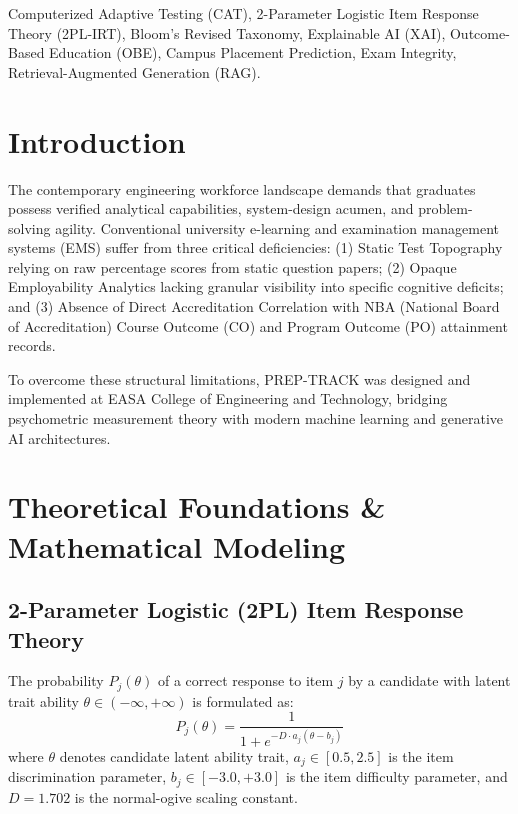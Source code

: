\documentclass[conference]{IEEEtran}
\begin{document}
\begin{IEEEkeywords}
Computerized Adaptive Testing (CAT), 2-Parameter Logistic Item Response Theory (2PL-IRT), Bloom's Revised Taxonomy, Explainable AI (XAI), Outcome-Based Education (OBE), Campus Placement Prediction, Exam Integrity, Retrieval-Augmented Generation (RAG).
\end{IEEEkeywords}

\section{Introduction}
The contemporary engineering workforce landscape demands that graduates possess verified analytical capabilities, system-design acumen, and problem-solving agility. Conventional university e-learning and examination management systems (EMS) suffer from three critical deficiencies: (1) Static Test Topography relying on raw percentage scores from static question papers; (2) Opaque Employability Analytics lacking granular visibility into specific cognitive deficits; and (3) Absence of Direct Accreditation Correlation with NBA (National Board of Accreditation) Course Outcome (CO) and Program Outcome (PO) attainment records.

To overcome these structural limitations, PREP-TRACK was designed and implemented at EASA College of Engineering and Technology, bridging psychometric measurement theory with modern machine learning and generative AI architectures.

\section{Theoretical Foundations \& Mathematical Modeling}

\subsection{2-Parameter Logistic (2PL) Item Response Theory}
The probability $P_j(\theta)$ of a correct response to item $j$ by a candidate with latent trait ability $\theta \in (-\infty, +\infty)$ is formulated as:
\begin{equation}
P_j(\theta) = \frac{1}{1 + e^{-D \cdot a_j (\theta - b_j)}}
\end{equation}
where $\theta$ denotes candidate latent ability trait, $a_j \in [0.5, 2.5]$ is the item discrimination parameter, $b_j \in [-3.0, +3.0]$ is the item difficulty parameter, and $D = 1.702$ is the normal-ogive scaling constant.
\end{document}

